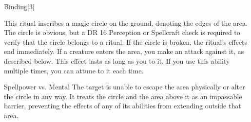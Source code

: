 \begin{spellsection}{Binding}[3]
\begin{spellcontent}
\begin{spelltargetinginfo}
\end{spelltargetinginfo}
\begin{spelleffects}
\spelleffect
This ritual inscribes a magic circle on the ground, denoting the edges of the area.
The circle is obvious, but a DR 16 Perception or Spellcraft check is required to verify that the circle belongs to a  ritual.
If the circle is broken, the ritual's effects end immediately.
If a creature enters the area, you make an attack against it, as described below.
This effect lasts as long as you  to it.
If you use this ability multiple times, you can attune to it each time.
\begin{spellattack}{Spellpower vs. Mental}
\spellsuccess
The target is unable to escape the area physically or alter the circle in any way.
It treats the circle and the area above it as an impassable barrier, preventing the effects of any of its abilities from extending outside that area.
\end{spellattack}
\end{spelleffects}
\end{spellcontent}
\begin{spellfooter}
\end{spellfooter}
\begin{spellsubcontent}
\end{spellsubcontent}
\end{spellsection}
